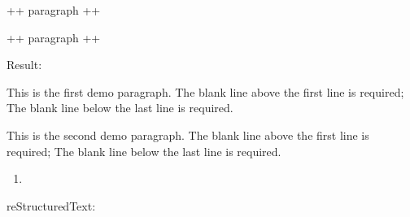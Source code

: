 \documentclass[letterpaper,12pt,english]{sphinxmanual}
\begin{document}
\begin{sphinxVerbatim}[commandchars=\\\{\}]
+\PYGZhy{}\PYGZhy{}\PYGZhy{}\PYGZhy{}\PYGZhy{}\PYGZhy{}\PYGZhy{}\PYGZhy{}\PYGZhy{}\PYGZhy{}\PYGZhy{}\PYGZhy{}\PYGZhy{}\PYGZhy{}\PYGZhy{}\PYGZhy{}\PYGZhy{}\PYGZhy{}\PYGZhy{}\PYGZhy{}\PYGZhy{}\PYGZhy{}\PYGZhy{}\PYGZhy{}\PYGZhy{}\PYGZhy{}\PYGZhy{}\PYGZhy{}\PYGZhy{}\PYGZhy{}+
 paragraph                    \textbar{}
                              \textbar{}
+\PYGZhy{}\PYGZhy{}\PYGZhy{}\PYGZhy{}\PYGZhy{}\PYGZhy{}\PYGZhy{}\PYGZhy{}\PYGZhy{}\PYGZhy{}\PYGZhy{}\PYGZhy{}\PYGZhy{}\PYGZhy{}\PYGZhy{}\PYGZhy{}\PYGZhy{}\PYGZhy{}\PYGZhy{}\PYGZhy{}\PYGZhy{}\PYGZhy{}\PYGZhy{}\PYGZhy{}\PYGZhy{}\PYGZhy{}\PYGZhy{}\PYGZhy{}\PYGZhy{}\PYGZhy{}+

+\PYGZhy{}\PYGZhy{}\PYGZhy{}\PYGZhy{}\PYGZhy{}\PYGZhy{}\PYGZhy{}\PYGZhy{}\PYGZhy{}\PYGZhy{}\PYGZhy{}\PYGZhy{}\PYGZhy{}\PYGZhy{}\PYGZhy{}\PYGZhy{}\PYGZhy{}\PYGZhy{}\PYGZhy{}\PYGZhy{}\PYGZhy{}\PYGZhy{}\PYGZhy{}\PYGZhy{}\PYGZhy{}\PYGZhy{}\PYGZhy{}\PYGZhy{}\PYGZhy{}\PYGZhy{}+
 paragraph                    \textbar{}
                              \textbar{}
+\PYGZhy{}\PYGZhy{}\PYGZhy{}\PYGZhy{}\PYGZhy{}\PYGZhy{}\PYGZhy{}\PYGZhy{}\PYGZhy{}\PYGZhy{}\PYGZhy{}\PYGZhy{}\PYGZhy{}\PYGZhy{}\PYGZhy{}\PYGZhy{}\PYGZhy{}\PYGZhy{}\PYGZhy{}\PYGZhy{}\PYGZhy{}\PYGZhy{}\PYGZhy{}\PYGZhy{}\PYGZhy{}\PYGZhy{}\PYGZhy{}\PYGZhy{}\PYGZhy{}\PYGZhy{}+
\end{sphinxVerbatim}

Result:

This is the first demo paragraph. The blank line above the first
line is required; The blank line below the last line is required.

This is the second demo paragraph. The blank line above the first
line is required; The blank line below the last line is required.
\begin{enumerate}
\def\theenumi{\arabic{enumi}}
\def\labelenumi{\theenumi .}
\makeatletter\def\p@enumii{\p@enumi \theenumi .}\makeatother
\setcounter{enumi}{1}
\item {} 

\end{enumerate}

reStructuredText:
\end{document}

